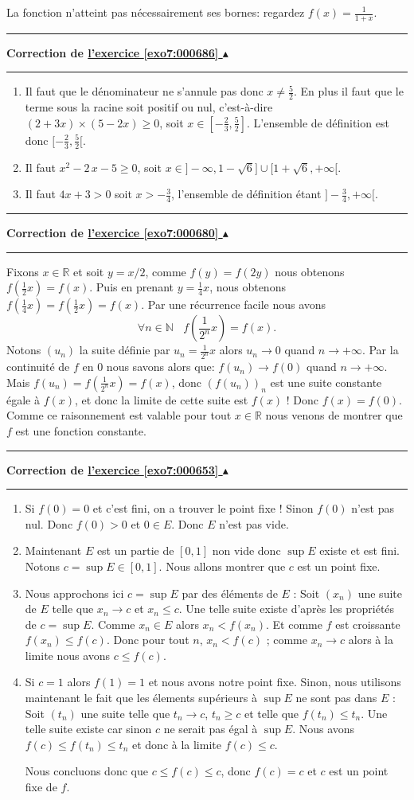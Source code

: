 \documentclass[11pt,a4paper]{article}
\newcommand{\Nn}{\mathbb{N}} \newcommand{\N}{\mathbb{N}}
\newcommand{\Rr}{\mathbb{R}} \newcommand{\R}{\mathbb{R}}
\newcounter{exo}
\newcommand{\correction}[1]{\hypertarget{cor7:#1}{}\label{cor7:#1}{\bf Correction de \hyperlink{exo7:#1}{l'exercice \ref{exo7:#1} $\blacktriangle$}}\vspace{1mm}\hrule\vspace{1mm}}
\newcommand{\fincorrection}{\vspace{1mm}\hrule\vspace*{7mm}}
\begin{document}
La fonction n'atteint pas n\'ecessairement ses bornes: regardez
$f(x) = \frac{1}{1+x}$.
\fincorrection
\correction{000686}
\begin{enumerate}
  \item Il faut que le d\'enominateur ne s'annule pas donc $x \not= \frac 52$. En plus il faut
que le terme sous la racine soit positif ou nul, c'est-\`a-dire $(2+3x)\times(5-2x) \geq 0$, soit
$x \in [-\frac23, \frac52]$. L'ensemble de d\'efinition est donc  $[-\frac23, \frac52[$.

  \item Il faut $x^2-2\,x-5\geq 0$, soit $x \in ]-\infty, 1-\sqrt6] \cup [1+\sqrt6,+\infty[$.
  \item Il faut $4x+3>0$ soit $x > -\frac34$, l'ensemble de d\'efinition \'etant $]-\frac34,+\infty[$.
\end{enumerate}
\fincorrection
\correction{000680}
Fixons $x\in \Rr$ et soit $y = x/2$, comme $f(y) = f(2y)$ nous obtenons $f(\frac 12 x) = f(x)$. Puis en prenant $y = \frac 14 x$, nous obtenons
$f(\frac 14 x) = f(\frac 12 x)= f(x)$. Par une r\'ecurrence facile nous avons
$$\forall n \in \Nn \ \ \ \ f(\frac 1{2^n} x) = f(x).$$
Notons $(u_n)$ la suite d\'efinie par $u_n = \frac 1{2^n} x$ alors
$u_n \rightarrow 0$ quand $n \rightarrow +\infty$.
Par la continuit\'e de $f$ en $0$ nous savons alors que:
$ f(u_n) \rightarrow f(0)$ quand $n \rightarrow +\infty$.
Mais $f(u_n) = f(\frac 1{2^n} x) = f(x)$, donc $(f(u_n))_n$ est une suite constante \'egale \`a $f(x)$, et donc la limite de cette suite est $f(x)$ ! Donc $f(x) = f(0)$. Comme ce raisonnement est valable pour tout $x \in \Rr$ nous venons de montrer que $f$ est une fonction constante.
\fincorrection
\correction{000653}
\begin{enumerate}
  \item  Si $f(0) = 0$ et c'est fini, on a trouver le point fixe !
Sinon $f(0)$ n'est pas nul.  Donc $f(0) > 0$ et $0 \in E$. Donc $E$ n'est pas vide. 
  \item Maintenant $E$ est un partie de $[0,1]$ non vide
donc $\sup E$ existe et est fini. Notons $c = \sup E \in [0,1]$.
Nous allons montrer que $c$ est un point fixe.
  \item Nous approchons ici $c = \sup E$ par des éléments de $E$ :
 Soit $(x_n)$ une suite de $E$ telle que $x_n \rightarrow c$
et $x_n \leq c$. Une telle suite existe d'apr\`es les propri\'et\'es de
$c= \sup E$. Comme $x_n \in E$ alors
$x_n < f(x_n)$. Et comme $f$ est croissante $f(x_n) \leq f(c)$.
Donc pour tout $n$, $x_n < f(c)$ ; comme $x_n \rightarrow c$ alors \`a la limite nous avons $c \leq f(c)$.
  \item Si $c=1$ alors $f(1)=1$ et nous avons notre point fixe. Sinon, nous utilisons maintenant le fait que 
les élements supérieurs à $\sup E$ ne sont pas dans $E$ :
Soit $(t_n)$ une suite telle que 
$t_n \rightarrow c$, $t_n \geq c$
et telle que $f(t_n) \leq t_n$. Une telle suite existe
car sinon $c$ ne serait pas \'egal \`a $\sup E$.
Nous avons $f(c) \leq f(t_n) \leq t_n$ et donc \`a la limite
$f(c) \leq c$.

Nous concluons donc que $c \leq f(c) \leq c$, donc $f(c) = c$
et $c$ est  un point fixe de $f$.
\end{enumerate}
\end{document}
